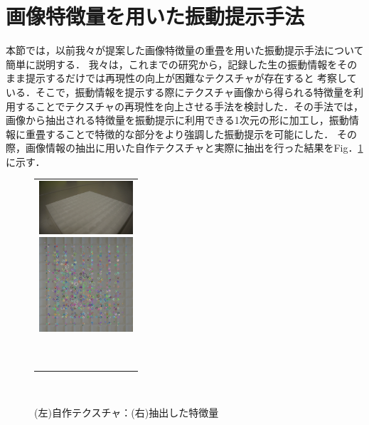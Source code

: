 \documentclass[a4paper]{jarticle}
\begin{document}
\section{画像特徴量を用いた振動提示手法}
本節では，以前我々が提案した画像特徴量の重畳を用いた振動提示手法について簡単に説明する．
我々は，これまでの研究から，記録した生の振動情報をそのまま提示するだけでは再現性の向上が困難なテクスチャが存在すると
考察している\cite{kurogi2018}．そこで，振動情報を提示する際にテクスチャ画像から得られる特徴量を利用することでテクスチャの再現性を向上させる手法を検討した．その手法では，画像から抽出される特徴量を振動提示に利用できる1次元の形に加工し，振動情報に重畳することで特徴的な部分をより強調した振動提示を可能にした．
その際，画像情報の抽出に用いた自作テクスチャと実際に抽出を行った結果をFig．\ref{fig2}に示す．

\begin{figure}[tb]
  \begin{center}
 \begin{tabular}{c}

    \begin{minipage}{0.33\hsize}
        \begin{center}
           \includegraphics*[width=35mm]{tile.eps}
           
           
        \end{center}
      \end{minipage}
   \begin{minipage}{0.06\hsize}
        \hspace{2mm}
      \end{minipage}
   \begin{minipage}{0.33\hsize}
       \begin{center}
          \includegraphics*[width=35mm]{akaze.eps}
	
      \end{center}
      
   \end{minipage}
　　\end{tabular}
      \caption{(左)自作テクスチャ：(右)抽出した特徴量}
　　　\label{fig2}
  \end{center}
\end{figure}
\end{document}
